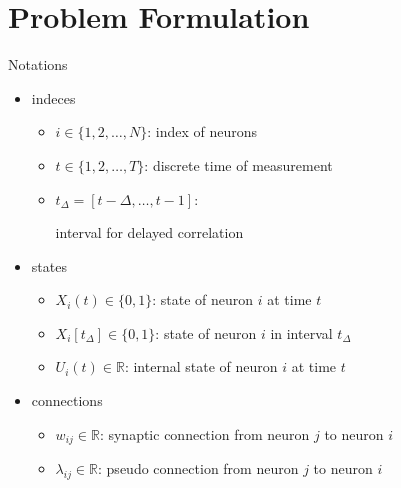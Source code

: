 \documentclass[fleqn,aspectratio=1610]{beamer}
\begin{document}
\section{Problem Formulation}
\label{sec:org8e1e241}
\begin{frame}[label={sec:orgd6553e9}]{Notations}
\begin{itemize}
\item indeces
\begin{itemize}
\item \(i\in\{1,2,\dotsc,N\}\):
index of neurons
\item \(t\in\{1,2,\dotsc,T\}\):
discrete time of measurement
\item \(t_{\Delta}=[t-\Delta,\dotsc,t-1]\):

interval for delayed correlation
\end{itemize}
\item states
\begin{itemize}
\item \(X_{i}(t)\in\{0,1\}\):
state of neuron \(i\) at time \(t\)
\item \(X_{i}[t_{\Delta}]\in\{0,1\}\):
state of neuron \(i\) in interval \(t_{\Delta}\)
\item \(U_{i}(t)\in\mathbb{R}\):
internal state of neuron \(i\) at time \(t\)
\end{itemize}
\item connections
\begin{itemize}
\item \(w_{ij}\in\mathbb{R}\):
synaptic connection from neuron \(j\) to neuron \(i\)
\item \(\lambda_{ij}\in\mathbb{R}\):
pseudo connection from neuron \(j\) to neuron \(i\)
\end{itemize}
\end{itemize}
\end{frame}
\end{document}
